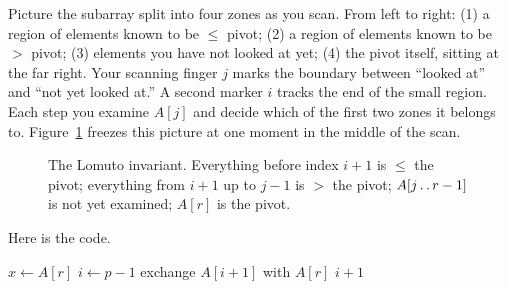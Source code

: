\begin{intuitionbox}
Picture the subarray split into four zones as you scan. From left to right:
(1) a region of elements known to be $\le$ pivot; (2) a region of elements known
to be $>$ pivot; (3) elements you have not looked at yet; (4) the pivot itself,
sitting at the far right. Your scanning finger $j$ marks the boundary between
``looked at'' and ``not yet looked at.'' A second marker $i$ tracks the end of
the small region. Each step you examine $A[j]$ and decide which of the first two
zones it belongs to. Figure~\ref{ch07:lomuto-zones} freezes this picture at one
moment in the middle of the scan.
\end{intuitionbox}

\begin{figure}[h]
\centering
{}
\caption{The Lomuto invariant. Everything before index $i+1$ is $\le$ the pivot;
everything from $i+1$ up to $j-1$ is $>$ the pivot; $A[j \mathinner{\ldotp\ldotp} r-1]$ is not yet
examined; $A[r]$ is the pivot.}
\label{ch07:lomuto-zones}
\end{figure}

Here is the code.

\begin{algorithm}[H]
\caption{\textsc{Partition}($A, p, r$) -- Lomuto scheme}
$x \leftarrow A[r]$ 
$i \leftarrow p - 1$ 
exchange $A[i+1]$ with $A[r]$ 
\Return $i+1$\;
\end{algorithm}

